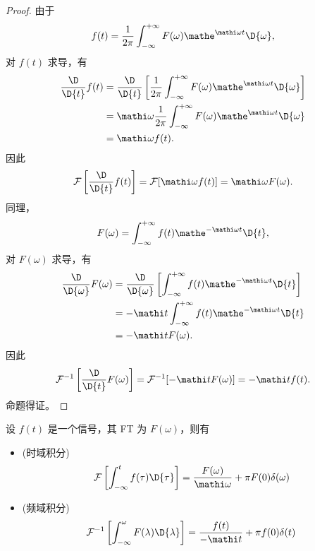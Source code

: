 \begin{proof}
    由于
    \begin{align*}
        f(t) = \frac{1}{2\pi}\int_{-\infty}^{+\infty}F(\omega)\mathe^{\mathi \omega t}\D{\omega},
    \end{align*}
    对 $f(t)$ 求导，有
    \begin{align*}
        \dfrac{\D}{\D{t}}f(t) & = \dfrac{\D}{\D{t}}\left[\frac{1}{2\pi}\int_{-\infty}^{+\infty}F(\omega)\mathe^{\mathi \omega t}\D{\omega}\right] \\
        & = \mathi \omega \frac{1}{2\pi}\int_{-\infty}^{+\infty}F(\omega)\mathe^{\mathi \omega t}\D{\omega} \\
        & = \mathi \omega f(t).
    \end{align*}
    因此
    \begin{align*}
        \mathcal{F}\left[\frac{\D}{\D{t}}f(t)\right] = \mathcal{F}[\mathi \omega f(t)] = \mathi \omega F(\omega).
    \end{align*}
    同理，
    \begin{align*}
        F(\omega) = \int_{-\infty}^{+\infty}f(t)\mathe^{-\mathi \omega t}\D{t},
    \end{align*}
    对 $F(\omega)$ 求导，有
    \begin{align*}
        \dfrac{\D}{\D{\omega}}F(\omega) & = \dfrac{\D}{\D{\omega}}\left[\int_{-\infty}^{+\infty}f(t)\mathe^{-\mathi \omega t}\D{t}\right] \\
        & = -\mathi t \int_{-\infty}^{+\infty}f(t)\mathe^{-\mathi \omega t}\D{t} \\
        & = -\mathi t F(\omega).
    \end{align*}
    因此
    \begin{align*}
        \mathcal{F}^{-1}\left[\frac{\D}{\D{t}}F(\omega)\right] = \mathcal{F}^{-1}[-\mathi t F(\omega)] = -\mathi t f(t).
    \end{align*}
    命题得证。
\end{proof}

\begin{property}[积分特性]
    设 $f(t)$ 是一个信号，其 FT 为 $F(\omega)$，则有
    \begin{itemize}
        \item (时域积分)
            \begin{align*}
                \mathcal{F}\left[\int_{-\infty}^{t}f(\tau)\D{\tau}\right] = \frac{F(\omega)}{\mathi\omega} + \pi F(0)\delta(\omega)
            \end{align*}
        \item (频域积分)
            \begin{align*}
                \mathcal{F}^{-1}\left[\int_{-\infty}^{\omega}F(\lambda)\D{\lambda}\right] = \frac{f(t)}{-\mathi t} + \pi f(0)\delta(t)
            \end{align*}
    \end{itemize}
\end{property}

